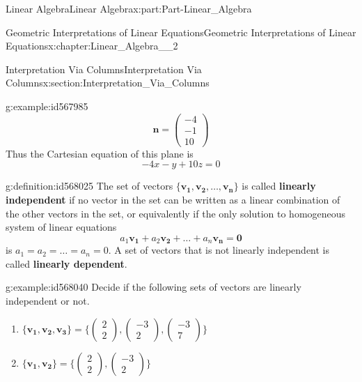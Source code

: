 \documentclass[oneside,10pt,]{book}
\newcommand{\terminology}[1]{\textbf{#1}}
\numberwithin{equation}{section}
\begin{document}
\begin{partptx}{Linear Algebra}{}{Linear Algebra}{}{}{x:part:Part-Linear_Algebra}
\begin{chapterptx}{Geometric Interpretations of Linear Equations}{}{Geometric Interpretations of Linear Equations}{}{}{x:chapter:Linear_Algebra__2}
\begin{sectionptx}{Interpretation Via Columns}{}{Interpretation Via Columns}{}{}{x:section:Interpretation_Via_Columns}
\begin{example}{}{g:example:id567985}
\begin{equation*}
\mathbf{n}=\begin{pmatrix} -4 \\ -1 \\ 10 \end{pmatrix}
\end{equation*}
Thus the Cartesian equation of this plane is%
\begin{equation*}
-4x-y+10z=0
\end{equation*}
%
\end{example}
\begin{definition}{}{g:definition:id568025}%
The set of vectors \(\mathbf{\{v_1, v_2, \dots, v_n\}}\) is called \terminology{linearly independent} if no vector in the set can be written as a linear combination of the other vectors in the set, or equivalently if the only solution to homogeneous system of linear equations%
\begin{equation*}
a_1\mathbf{v_1}+a_2\mathbf{v_2}+\dots +a_n\mathbf{v_n}=\mathbf{0}
\end{equation*}
is \(a_1=a_2=\dots=a_n=0\). A set of vectors that is not linearly independent is called \terminology{linearly dependent}.%
\end{definition}
\begin{example}{}{g:example:id568040}%
Decide if the following sets of vectors are linearly independent or not.%
\begin{enumerate}[label=(\alph*).]
\item{}\(\displaystyle \{\mathbf{v_1, v_2, v_3}\}=\Big\{\begin{pmatrix} 2 \\ 2 \end{pmatrix}, \begin{pmatrix} -3 \\ 2 \end{pmatrix}, \begin{pmatrix} -3 \\ 7 \end{pmatrix} \Big\}\)%
\item{}\(\displaystyle \{\mathbf{v_1, v_2}\}=\Big\{\begin{pmatrix} 2 \\ 2 \end{pmatrix}, \begin{pmatrix} -3 \\ 2 \end{pmatrix} \Big\}\)%
\end{enumerate}
%
\par\smallskip%

\end{example}
\end{sectionptx}
\end{chapterptx}
\end{partptx}
\end{document}
